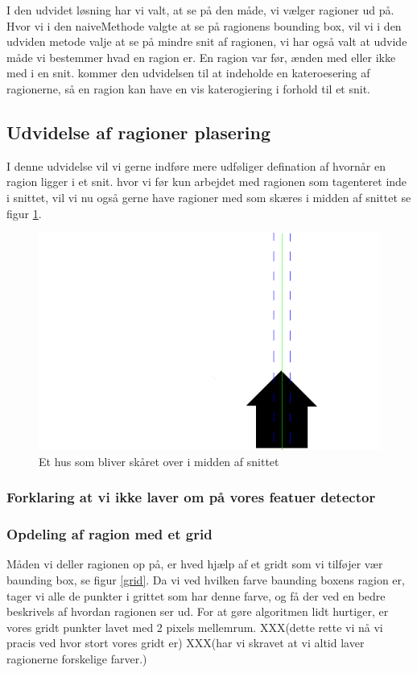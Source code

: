 I den udvidet løsning har vi valt, at se på den måde, vi vælger ragioner
ud på. Hvor vi i den naiveMethode valgte at se på ragionens bounding
box, vil vi i den udviden metode valje at se på mindre snit af ragionen,
vi har også valt at udvide måde vi bestemmer hvad en ragion er. En
ragion var før, ænden med eller ikke med i en snit. kommer den udvidelsen
til at indeholde en kateroesering af ragionerne, så en ragion kan have
en vis katerogiering i forhold til et snit. 

\subsection{Udvidelse af ragioner plasering}
I denne udvidelse vil vi gerne indføre mere udføliger defination af
hvornår en ragion ligger i et snit. hvor vi før kun arbejdet med
ragionen som tagenteret inde i snittet, vil vi nu også gerne have
ragioner med som skæres i midden af snittet se figur
\ref{hus}.

\begin{figure}[h]
	\begin{center}
		\includegraphics[scale=0.76,angle=0]{afsnit/vores_implementation/billeder/udvidet_loesning/husWorks.png}
	\end{center}
	\caption[]{Et hus som bliver skåret over i midden af snittet}
	\label{hus}
\end{figure}

\subsubsection{Forklaring at vi ikke laver om på vores featuer detector}


\subsubsection{Opdeling af ragion med et grid}
Måden vi deller ragionen op på, er hved hjælp af et gridt som vi
tilføjer vær baunding box, se figur \ref{grid}. Da vi ved hvilken farve
baunding boxens ragion er, tager vi alle de punkter i grittet som har
denne farve, og få der ved en bedre beskrivels af hvordan ragionen ser
ud. For at gøre algoritmen lidt hurtiger, er vores gridt punkter lavet
med 2 pixels mellemrum. XXX(dette rette vi nå vi pracis ved hvor stort
vores gridt er) XXX(har vi skravet at vi altid laver ragionerne
forskelige farver.)

